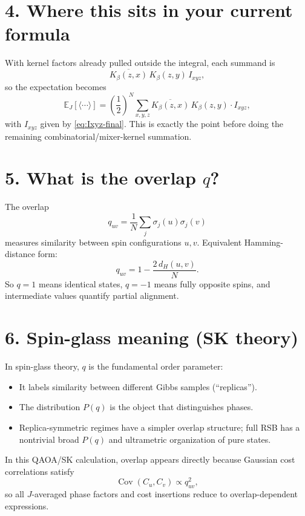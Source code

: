 \documentclass[11pt]{article}
\newcommand{\E}{\mathbb{E}}
\DeclareMathOperator{\Cov}{Cov}
\begin{document}
	\section*{4. Where this sits in your current formula}
	With kernel factors already pulled outside the integral, each summand is
	\begin{equation}
		\overline{K_\beta(z,x)}\,K_\beta(z,y)\,I_{xyz},
	\end{equation}
	so the expectation becomes
	\begin{equation}
		\E_J[\langle\cdots\rangle]
		=
		\left(\frac12\right)^N
		\sum_{x,y,z}
		\overline{K_\beta(z,x)}\,K_\beta(z,y)
		\cdot I_{xyz},
	\end{equation}
	with $I_{xyz}$ given by \eqref{eq:Ixyz-final}.
	This is exactly the point before doing the remaining combinatorial/mixer-kernel summation.
	
	\section*{5. What is the overlap $q$?}
	The overlap
	\begin{equation}
		q_{uv}=\frac1N\sum_j \sigma_j(u)\sigma_j(v)
	\end{equation}
	measures similarity between spin configurations $u,v$.
	Equivalent Hamming-distance form:
	\begin{equation}
		q_{uv}=1-\frac{2\,d_H(u,v)}{N}.
	\end{equation}
	So $q=1$ means identical states, $q=-1$ means fully opposite spins, and intermediate values quantify partial alignment.
	
	\section*{6. Spin-glass meaning (SK theory)}
	In spin-glass theory, $q$ is the fundamental order parameter:
	\begin{itemize}
		\item It labels similarity between different Gibbs samples (``replicas'').
		\item The distribution $P(q)$ is the object that distinguishes phases.
		\item Replica-symmetric regimes have a simpler overlap structure; full RSB has a nontrivial broad $P(q)$ and ultrametric organization of pure states.
	\end{itemize}
	In this QAOA/SK calculation, overlap appears directly because Gaussian cost correlations satisfy
	\begin{equation}
		\Cov(C_u,C_v)\propto q_{uv}^2,
	\end{equation}
	so all $J$-averaged phase factors and cost insertions reduce to overlap-dependent expressions.
	
\end{document}
